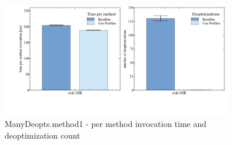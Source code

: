 \begin{figure}[ht]
  \begin{center}
    \centering
    \includegraphics[width=0.9\textwidth]{figures/manydeopt.png}
    \caption{ManyDeopts.method1 - per method invocation time and deoptimization count}
    \label{f:manydeopts}
  \end{center}
\end{figure}

